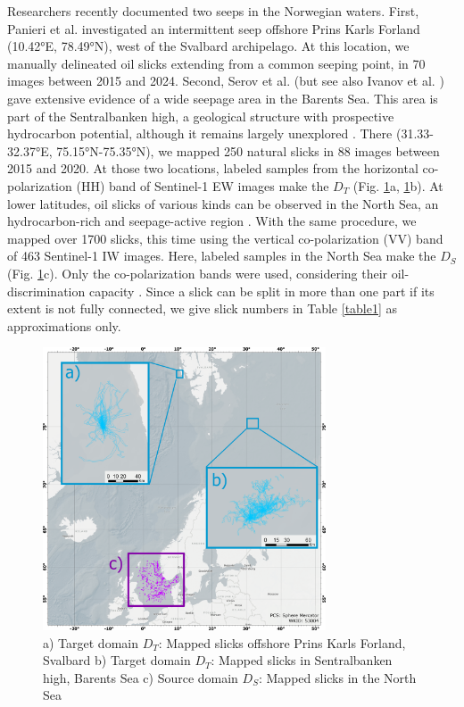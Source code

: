 \documentclass[journal]{IEEEtran}
\begin{document}
Researchers recently documented two seeps in the Norwegian waters. First, Panieri et al. \cite{panieriArcticNaturalOil2024} investigated an intermittent seep offshore Prins Karls Forland 
(10.42°E, 78.49°N), west of the Svalbard archipelago. At this location, we manually delineated oil slicks extending from a common seeping point, in 70 images between 2015 and 2024.
Second, Serov et al. \cite{serovWidespreadNaturalMethane2023} (but see also Ivanov et al. \cite{ivanovSearchDetectionNatural2020}) gave extensive evidence of a wide seepage area in the Barents Sea. 
This area is part of the Sentralbanken high, a geological structure with prospective hydrocarbon potential, although it remains largely unexplored \cite{lundschienNorthBarentsComposite2025}. 
There (31.33-32.37°E, 75.15°N-75.35°N), we mapped 250 natural slicks in 88 images between 2015 and 2020.
At those two locations, labeled samples from the horizontal co-polarization (HH) band of Sentinel-1 EW images make the $\mathit{D}_T$ (Fig. \ref{figure1}a, \ref{figure1}b). 
At lower latitudes, oil slicks of various kinds can be observed in the North Sea, an hydrocarbon-rich and seepage-active region \cite{hovlandChapter2Focus1988}. 
With the same procedure, we mapped over 1700 slicks, this time using the vertical co-polarization (VV) band of 463 Sentinel-1 IW images. Here, labeled samples in the North Sea make the $\mathit{D}_S$ (Fig. \ref{figure1}c).
Only the co-polarization bands were used, considering their oil-discrimination capacity \cite{kudryavtsevDualCoPolarizedSAR2013,johanssonMultifrequencyPolarimetricSAR2017,brekkeSAROilSpill2020}.
Since a slick can be split in more than one part if its extent is not fully connected, we give slick numbers in Table \ref{table1} as approximations only.
\begin{figure}[!t]
    \centering
    \includegraphics[width=3.3in]{figures/layout2_grids.png} %
    \caption{a) Target domain \( \mathit{D}_T \): Mapped slicks offshore Prins Karls Forland, Svalbard \quad b) Target domain \( \mathit{D}_T \): Mapped slicks in Sentralbanken high, Barents Sea \quad 
    c) Source domain \( \mathit{D}_S \): Mapped slicks in the North Sea}
    \label{figure1}
\end{figure}
\end{document}
